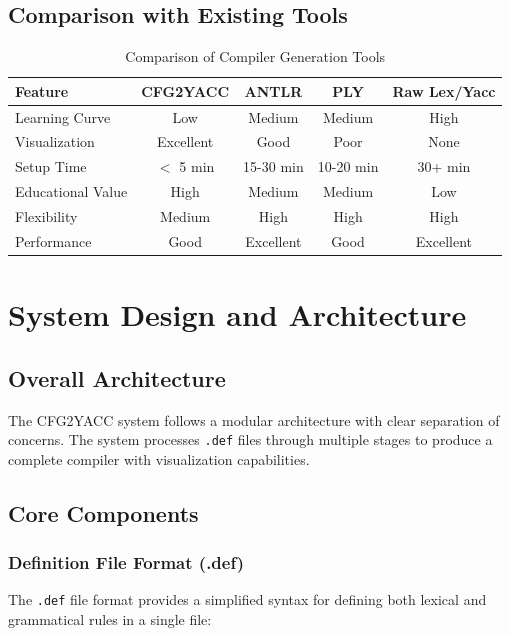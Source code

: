 \documentclass[a4paper,12pt]{report}
\begin{document}
\section{Comparison with Existing Tools}
\begin{table}[H]
\centering
\begin{tabular}{|l|c|c|c|c|}
\hline
\textbf{Feature} & \textbf{CFG2YACC} & \textbf{ANTLR} & \textbf{PLY} & \textbf{Raw Lex/Yacc} \\
\hline
Learning Curve & Low & Medium & Medium & High \\
Visualization & Excellent & Good & Poor & None \\
Setup Time & $<$ 5 min & 15-30 min & 10-20 min & 30+ min \\
Educational Value & High & Medium & Medium & Low \\
Flexibility & Medium & High & High & High \\
Performance & Good & Excellent & Good & Excellent \\
\hline
\end{tabular}
\caption{Comparison of Compiler Generation Tools}
\label{tab:tool_comparison}
\end{table}

\newpage

\chapter{System Design and Architecture}
\thispagestyle{contentpages}
\justifying

\section{Overall Architecture}
The CFG2YACC system follows a modular architecture with clear separation of concerns. The system processes \texttt{.def} files through multiple stages to produce a complete compiler with visualization capabilities.

\section{Core Components}

\subsection{Definition File Format (.def)}
The \texttt{.def} file format provides a simplified syntax for defining both lexical and grammatical rules in a single file:
\end{document}
